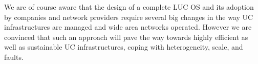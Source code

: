 We are of course aware that the design of a complete LUC OS and its adoption by
companies and network providers require several big changes in the way UC
infrastructures are managed and wide area networks operated. However we are
convinced that such an approach will pave the way towards highly efficient as
well as sustainable UC infrastructures, coping with heterogeneity, scale, and
faults. 


